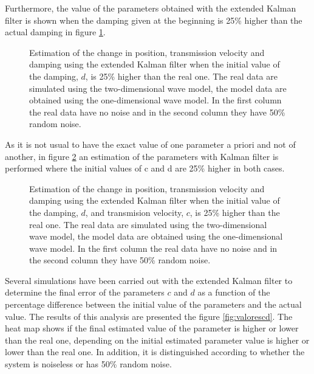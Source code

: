 \documentclass[12pt, a4paper]{article} %
\begin{document}
Furthermore, the value of the parameters obtained with the extended Kalman filter is shown when the damping given at the beginning is 25\% higher than the actual damping in figure \ref{fig:kalman1d}.

\begin{figure}[h!]
    \centering
    
    \caption{Estimation of the change in position, transmission velocity and damping using the extended Kalman filter when the initial value of the damping, $d$, is 25\% higher than the real one. The real data are simulated using the two-dimensional wave model, the model data are obtained using the one-dimensional wave model. In the first column the real data have no noise and in the second column they have 50\% random noise.}
    \label{fig:kalman1d}
\end{figure}

\newpage

As it is not usual to have the exact value of one parameter a priori and not of another, in figure \ref{fig:kalman1dc} an estimation of the parameters with Kalman filter is performed where the initial values of c and d are 25\% higher in both cases.

\newpage

\begin{figure}[h!]
    \centering
    
    \caption{Estimation of the change in position, transmission velocity and damping using the extended Kalman filter when the initial value of the damping, $d$, and transmision velocity, $c$, is 25\% higher than the real one. The real data are simulated using the two-dimensional wave model, the model data are obtained using the one-dimensional wave model. In the first column the real data have no noise and in the second column they have 50\% random noise.}
    \label{fig:kalman1dc}
\end{figure}

Several simulations have been carried out with the extended Kalman filter to determine the final error of the parameters $c$ and $d$ as a function of the percentage difference between the initial value of the parameters and the actual value. The results of this analysis are presented the figure \ref{fig:valorescd}. The heat map shows if the final estimated value of the parameter is higher or lower than the real one, depending on the initial estimated parameter value is higher or lower than the real one. In addition, it is distinguished according to whether the system is noiseless or has 50\% random noise.
\end{document}
